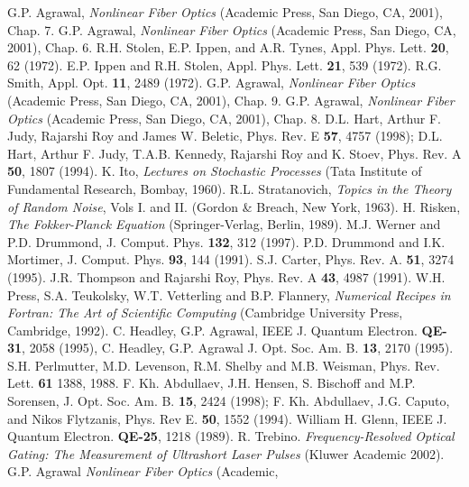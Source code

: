 \begin{thebibliography}{99}
 G.P. Agrawal, {\em Nonlinear Fiber Optics} (Academic
Press, San Diego, CA, 2001), Chap. 7.
 G.P. Agrawal, {\em Nonlinear Fiber Optics} (Academic
Press, San Diego, CA, 2001), Chap. 6.
 R.H. Stolen, E.P. Ippen, and A.R. Tynes,
Appl. Phys. Lett. \textbf{20}, 62 (1972).
 E.P. Ippen and R.H. Stolen, Appl. Phys. Lett. \textbf{21},
539 (1972).
 R.G. Smith, Appl. Opt. \textbf{11}, 2489 (1972).
 G.P. Agrawal, {\em Nonlinear Fiber Optics} (Academic
Press, San Diego, CA, 2001), Chap. 9.
 G.P. Agrawal, {\em Nonlinear Fiber Optics} (Academic
Press, San Diego, CA, 2001), Chap. 8.
 D.L. Hart, Arthur F. Judy, Rajarshi Roy and James W. Beletic, Phys. Rev. E \textbf{57}, 4757 (1998); D.L. Hart, Arthur F. Judy, T.A.B. Kennedy, Rajarshi Roy and K. Stoev, Phys. Rev. A \textbf{50}, 1807 (1994).
 K. Ito, {\em Lectures on Stochastic Processes} (Tata Institute of Fundamental Research, Bombay, 1960).
 R.L. Stratanovich, {\em Topics in the Theory of Random Noise}, Vols I. and II. (Gordon \& Breach, New York, 1963).
 H. Risken, {\em The Fokker-Planck Equation} (Springer-Verlag, Berlin, 1989).
 M.J. Werner and P.D. Drummond, J. Comput. Phys. \textbf{132}, 312 (1997).
 P.D. Drummond and I.K. Mortimer, J. Comput. Phys. \textbf{93}, 144 (1991).
 S.J. Carter, Phys. Rev. A. \textbf{51}, 3274 (1995).
 J.R. Thompson and Rajarshi Roy, Phys. Rev. A \textbf{43}, 4987 (1991).
 W.H. Press, S.A. Teukolsky, W.T. Vetterling and B.P. Flannery, {\em Numerical Recipes in Fortran: The Art of Scientific Computing} (Cambridge University Press, Cambridge, 1992).
 C. Headley, G.P. Agrawal, IEEE J. Quantum Electron. \textbf{QE-31}, 2058 (1995), C. Headley, G.P. Agrawal J. Opt. Soc. Am. B. \textbf{13}, 2170 (1995).
 S.H. Perlmutter, M.D. Levenson, R.M. Shelby and
M.B. Weisman, Phys. Rev. Lett. \textbf{61} 1388, 1988.
 F. Kh. Abdullaev, J.H. Hensen, S. Bischoff and M.P. Sorensen, J. Opt. Soc. Am. B. \textbf{15}, 2424 (1998); F. Kh. Abdullaev, J.G. Caputo, and Nikos Flytzanis, Phys. Rev E. \textbf{50}, 1552 (1994).
 William H. Glenn, IEEE J. Quantum Electron. \textbf{QE-25}, 1218 (1989).
 R. Trebino. {\em Frequency-Resolved Optical Gating: The Measurement of Ultrashort Laser Pulses} (Kluwer Academic 2002).
 G.P. Agrawal {\em Nonlinear Fiber Optics} (Academic,

\end{thebibliography}
